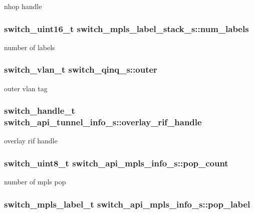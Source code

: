 nhop handle \hypertarget{group__Tunnel_ga601501fd20b6f5d298fb0f06ce0897d5}{
\subsubsection[{num\+\_\+labels}]{\setlength{\rightskip}{0pt plus 5cm}switch\+\_\+uint16\+\_\+t switch\+\_\+mpls\+\_\+label\+\_\+stack\+\_\+s\+::num\+\_\+labels}}\label{group__Tunnel_ga601501fd20b6f5d298fb0f06ce0897d5}
number of labels \hypertarget{group__Tunnel_ga49a0974681b01e892b9518aa253488df}{
\subsubsection[{outer}]{\setlength{\rightskip}{0pt plus 5cm}switch\+\_\+vlan\+\_\+t switch\+\_\+qinq\+\_\+s\+::outer}}\label{group__Tunnel_ga49a0974681b01e892b9518aa253488df}
outer vlan tag \hypertarget{group__Tunnel_ga1ad550339f0fde32bb88063b0141a0cc}{
\subsubsection[{overlay\+\_\+rif\+\_\+handle}]{\setlength{\rightskip}{0pt plus 5cm}switch\+\_\+handle\+\_\+t switch\+\_\+api\+\_\+tunnel\+\_\+info\+\_\+s\+::overlay\+\_\+rif\+\_\+handle}}\label{group__Tunnel_ga1ad550339f0fde32bb88063b0141a0cc}
overlay rif handle \hypertarget{group__Tunnel_gaf0d8b8fada5e6ac49400245cafe38524}{
\subsubsection[{pop\+\_\+count}]{\setlength{\rightskip}{0pt plus 5cm}switch\+\_\+uint8\+\_\+t switch\+\_\+api\+\_\+mpls\+\_\+info\+\_\+s\+::pop\+\_\+count}}\label{group__Tunnel_gaf0d8b8fada5e6ac49400245cafe38524}
number of mpls pop \hypertarget{group__Tunnel_ga6c0a6fe3e1634d7041b2812d232f9fe2}{
\subsubsection[{pop\+\_\+label}]{\setlength{\rightskip}{0pt plus 5cm}switch\+\_\+mpls\+\_\+label\+\_\+t switch\+\_\+api\+\_\+mpls\+\_\+info\+\_\+s\+::pop\+\_\+label}}\label{group__Tunnel_ga6c0a6fe3e1634d7041b2812d232f9fe2}
